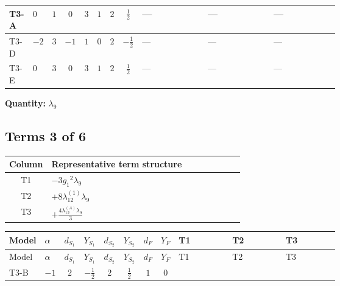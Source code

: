 \documentclass[8pt]{article}
\begin{document}
\begin{landscape}
\begin{longtable}{@{}llcccccc >{\raggedright\arraybackslash}p{0.21\linewidth} >{\raggedright\arraybackslash}p{0.21\linewidth} >{\raggedright\arraybackslash}p{0.21\linewidth}@{}}
\midrule
T3-A & $0$ & $1$ & $0$ & $3$ & $1$ & $2$ & $\frac{1}{2}$ & --- & --- & --- \\
\midrule
T3-D & $-2$ & $3$ & $-1$ & $1$ & $0$ & $2$ & $-\frac{1}{2}$ & --- & --- & --- \\
\midrule
T3-E & $0$ & $3$ & $0$ & $3$ & $1$ & $2$ & $\frac{1}{2}$ & --- & --- & --- \\
\midrule
\bottomrule
\end{longtable}
\clearpage
\noindent\textbf{Quantity: }$\lambda_{9}$\par\smallskip
\subsection*{Terms 3 of 6}
\begin{center}
\begin{tabular}{@{}c >{\raggedright\arraybackslash}p{0.82\linewidth}@{}}
\toprule
Column & Representative term structure \\
\midrule
T1 & \(\displaystyle -3 {g_1}^2 {\lambda_9}\) \\
\midrule
T2 & \(\displaystyle +8 {\lambda_{12}^{(1)}} {\lambda_9}\) \\
\midrule
T3 & \(\displaystyle +\frac{4 {\lambda_{12}^{(A)}} {\lambda_9}}{3}\) \\
\midrule
\bottomrule
\end{tabular}
\end{center}
\smallskip
\tiny
\begin{longtable}{@{}llcccccc >{\raggedright\arraybackslash}p{0.21\linewidth} >{\raggedright\arraybackslash}p{0.21\linewidth} >{\raggedright\arraybackslash}p{0.21\linewidth}@{}}
\toprule
Model & $\alpha$ & $d_{S_1}$ & $Y_{S_1}$ & $d_{S_2}$ & $Y_{S_2}$ & $d_F$ & $Y_F$ & T1 & T2 & T3 \\
\midrule
\endfirsthead
\toprule
Model & $\alpha$ & $d_{S_1}$ & $Y_{S_1}$ & $d_{S_2}$ & $Y_{S_2}$ & $d_F$ & $Y_F$ & T1 & T2 & T3 \\
\midrule
\endhead
T3-B & $-1$ & $2$ & $-\frac{1}{2}$ & $2$ & $\frac{1}{2}$ & $1$ & $0$ & \scriptsize\adjustbox{max width=\linewidth}{$\begin{gathered} -3 {g_1}^2 {\lambda_9}\end{gathered}$} & \scriptsize\adjustbox{max width=\linewidth}{$\begin{gathered} +8 {\lambda_{12}^{(1)}} {\lambda_9}\end{gathered}$} & \scriptsize\adjustbox{max width=\linewidth}{$\begin{gathered} +\frac{4 {\lambda_{12}^{(A)}} {\lambda_9}}{3}\end{gathered}$} \\

\end{longtable}
\end{landscape}
\end{document}
